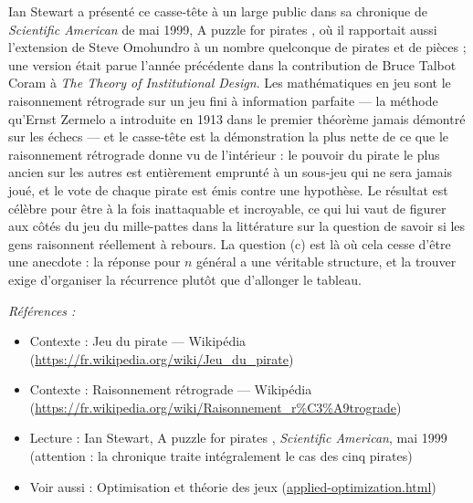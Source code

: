 \documentclass[11pt]{article}
\newenvironment{refs}{\par\small\noindent\emph{Références :}\begin{itemize}\setlength\itemsep{0pt}}{\end{itemize}\normalsize}
\begin{document}
\noindent Ian Stewart a présenté ce casse-tête à un large public dans sa chronique
de \textit{Scientific American} de mai 1999, \og{} A puzzle for pirates \fg{}, où il rapportait aussi
l'extension de Steve Omohundro à un nombre quelconque de pirates et de pièces ; une version
était parue l'année précédente dans la contribution de Bruce Talbot Coram à \textit{The Theory of
Institutional Design}. Les mathématiques en jeu sont le raisonnement rétrograde sur un jeu
fini à information parfaite --- la méthode qu'Ernst Zermelo a introduite en 1913 dans le
premier théorème jamais démontré sur les échecs --- et le casse-tête est la démonstration la
plus nette de ce que le raisonnement rétrograde donne vu de l'intérieur : le pouvoir du
pirate le plus ancien sur les autres est entièrement emprunté à un sous-jeu qui ne sera
jamais joué, et le vote de chaque pirate est émis contre une hypothèse. Le résultat est
célèbre pour être à la fois inattaquable et incroyable, ce qui lui vaut de figurer aux côtés
du jeu du mille-pattes dans la littérature sur la question de savoir si les gens raisonnent
réellement à rebours. La question (c) est là où cela cesse d'être une anecdote : la réponse
pour $ n $ général a une véritable structure, et la trouver exige d'organiser la récurrence
plutôt que d'allonger le tableau.

\begin{refs}
\item Contexte : Jeu du pirate --- Wikipédia (\url{https://fr.wikipedia.org/wiki/Jeu_du_pirate})
\item Contexte : Raisonnement rétrograde --- Wikipédia (\url{https://fr.wikipedia.org/wiki/Raisonnement_r%C3%A9trograde})
\item Lecture : Ian Stewart, \og{} A puzzle for pirates \fg{}, \textit{Scientific American}, mai 1999 (attention : la chronique traite intégralement le cas des cinq pirates)
\item Voir aussi : Optimisation et théorie des jeux (\url{applied-optimization.html})
\end{refs}

\bigskip
\end{document}
